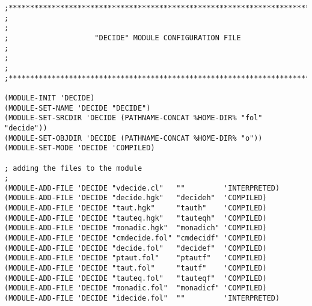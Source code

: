 \begin{boxverbatim}
\begin{verbatim}
;************************************************************************;
;                                                                        ;
;                    "DECIDE" MODULE CONFIGURATION FILE                  ;
;                                                                        ;
;************************************************************************;

(MODULE-INIT 'DECIDE)
(MODULE-SET-NAME 'DECIDE "DECIDE")
(MODULE-SET-SRCDIR 'DECIDE (PATHNAME-CONCAT %HOME-DIR% "fol" "decide"))
(MODULE-SET-OBJDIR 'DECIDE (PATHNAME-CONCAT %HOME-DIR% "o"))
(MODULE-SET-MODE 'DECIDE 'COMPILED)

; adding the files to the module
;
(MODULE-ADD-FILE 'DECIDE "vdecide.cl"   ""         'INTERPRETED)
(MODULE-ADD-FILE 'DECIDE "decide.hgk"   "decideh"  'COMPILED)
(MODULE-ADD-FILE 'DECIDE "taut.hgk"     "tauth"    'COMPILED)
(MODULE-ADD-FILE 'DECIDE "tauteq.hgk"   "tauteqh"  'COMPILED)
(MODULE-ADD-FILE 'DECIDE "monadic.hgk"  "monadich" 'COMPILED)
(MODULE-ADD-FILE 'DECIDE "cmdecide.fol" "cmdecidf" 'COMPILED)
(MODULE-ADD-FILE 'DECIDE "decide.fol"   "decidef"  'COMPILED)
(MODULE-ADD-FILE 'DECIDE "ptaut.fol"    "ptautf"   'COMPILED)
(MODULE-ADD-FILE 'DECIDE "taut.fol"     "tautf"    'COMPILED)
(MODULE-ADD-FILE 'DECIDE "tauteq.fol"   "tauteqf"  'COMPILED)
(MODULE-ADD-FILE 'DECIDE "monadic.fol"  "monadicf" 'COMPILED)
(MODULE-ADD-FILE 'DECIDE "idecide.fol"  ""         'INTERPRETED)
\end{verbatim}
\end{boxverbatim}
